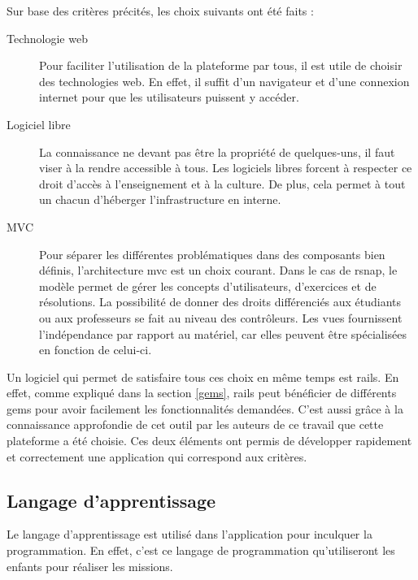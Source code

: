 Sur base des critères précités, les choix suivants ont été faits :
\begin{description}
  \item[Technologie web] Pour faciliter l'utilisation de la plateforme par tous, il est utile de choisir des technologies web. En effet, il suffit d'un navigateur et d'une connexion internet pour que les utilisateurs puissent y accéder.
  \item[Logiciel libre] La connaissance ne devant pas être la propriété de quelques-uns, il faut viser à la rendre accessible à tous. Les logiciels libres forcent à respecter ce droit d'accès à l'enseignement et à la culture. De plus, cela permet à tout un chacun d'héberger l'infrastructure en interne.
  \item[MVC] Pour séparer les différentes problématiques dans des composants bien définis, l'architecture \gls{mvc} est un choix courant. Dans le cas de \gls{rsnap}, le modèle permet de gérer les concepts d'utilisateurs, d'exercices et de résolutions. La possibilité de donner des droits différenciés aux étudiants ou aux professeurs se fait au niveau des contrôleurs. Les vues fournissent l'indépendance par rapport au matériel, car elles peuvent être spécialisées en fonction de celui-ci.
\end{description}
Un logiciel qui permet de satisfaire tous ces choix en même temps est \gls{rails}. En effet, comme expliqué dans la section \ref{gems}, \gls{rails} peut bénéficier de différents \glspl{gem}  pour avoir facilement les fonctionnalités demandées. C'est aussi grâce à la connaissance approfondie de cet outil par les auteurs de ce travail que cette plateforme a été choisie. Ces deux éléments ont permis de développer rapidement et correctement une application qui correspond aux critères.

\subsection{Langage d'apprentissage}
Le langage d'apprentissage est utilisé dans l'application pour inculquer la programmation. En effet, c'est ce langage de programmation qu'utiliseront les enfants pour réaliser les \glspl{mission}.

